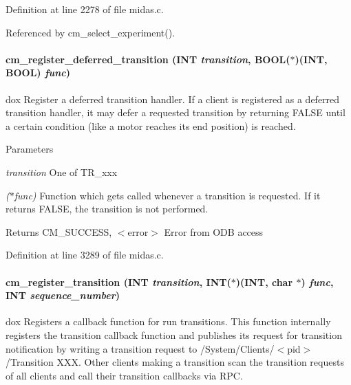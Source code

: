 Definition at line 2278 of file midas.c.

Referenced by cm\_\-select\_\-experiment().
\paragraph[{cm\_\-register\_\-deferred\_\-transition}]{ cm\_\-register\_\-deferred\_\-transition ({\bf INT} {\em transition}, \/  {\bf BOOL}($\ast$)({\bf INT}, {\bf BOOL}) {\em func})}\hfill\label{group__cmfunctionc_gaa043c651932a8d63ce6104a9ad79f370}
dox Register a deferred transition handler. If a client is registered as a deferred transition handler, it may defer a requested transition by returning FALSE until a certain condition (like a motor reaches its end position) is reached. 
\begin{DoxyParams}{Parameters}
\item[{\em transition}]One of TR\_\-xxx \item[{\em ($\ast$func)}]Function which gets called whenever a transition is requested. If it returns FALSE, the transition is not performed. \end{DoxyParams}
\begin{DoxyReturn}{Returns}
CM\_\-SUCCESS, $<$error$>$ Error from ODB access 
\end{DoxyReturn}


Definition at line 3289 of file midas.c.
\paragraph[{cm\_\-register\_\-transition}]{ cm\_\-register\_\-transition ({\bf INT} {\em transition}, \/  {\bf INT}($\ast$)({\bf INT}, char $\ast$) {\em func}, \/  {\bf INT} {\em sequence\_\-number})}\hfill\label{group__cmfunctionc_ga00950930acadf846be75239b6d0e80dc}
dox Registers a callback function for run transitions. This function internally registers the transition callback function and publishes its request for transition notification by writing a transition request to /System/Clients/$<$pid$>$/Transition XXX. Other clients making a transition scan the transition requests of all clients and call their transition callbacks via RPC.

